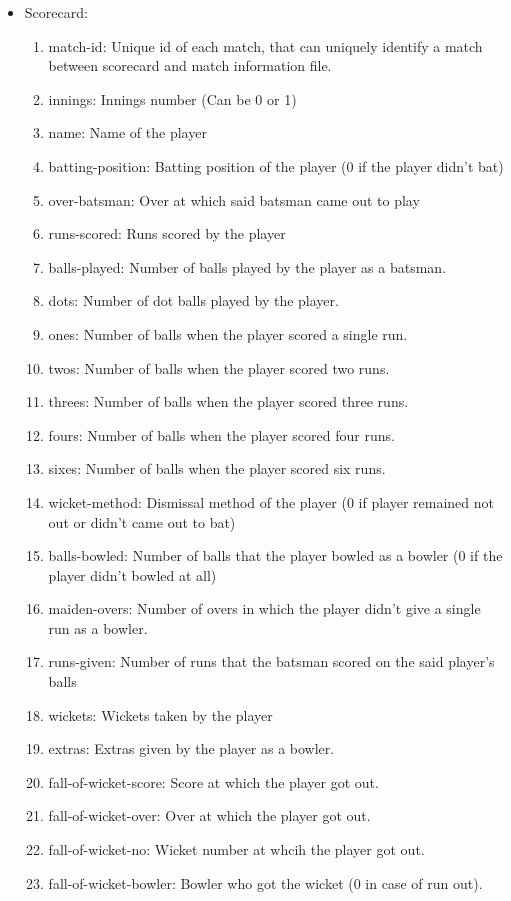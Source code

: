 \documentclass[fleqn,10pt]{wlscirep}
\begin{document}
\begin{itemize}
\item Scorecard:
\begin{enumerate}
\item match-id: Unique id of each match, that can uniquely identify a match between scorecard and match information file.
\item innings: Innings number (Can be 0 or 1)
\item name: Name of the player
\item batting-position: Batting position of the player (0 if the player didn't bat)
\item over-batsman: Over at which said batsman came out to play
\item runs-scored: Runs scored by the player
\item balls-played: Number of balls played by the player as a batsman.
\item dots: Number of dot balls played by the player.
\item ones: Number of balls when the player scored a single run.
\item twos: Number of balls when the player scored two runs.
\item threes: Number of balls when the player scored three runs.
\item fours: Number of balls when the player scored four runs.
\item sixes: Number of balls when the player scored six runs.
\item wicket-method: Dismissal method of the player (0 if player remained not out or didn't came out to bat)
\item balls-bowled: Number of balls that the player bowled as a bowler (0 if the player didn't bowled at all)
\item maiden-overs: Number of overs in which the player didn't give a single run as a bowler.
\item runs-given: Number of runs that the batsman scored on the said player's balls 
\item wickets: Wickets taken by the player 
\item extras: Extras given by the player as a bowler.
\item fall-of-wicket-score: Score at which the player got out.
\item fall-of-wicket-over: Over at which the player got out.
\item fall-of-wicket-no: Wicket number at whcih the player got out.
\item fall-of-wicket-bowler: Bowler who got the wicket (0 in case of run out).

\end{enumerate}
\end{itemize}
\end{document}
